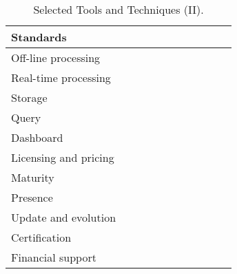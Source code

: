 \begin{sidewaystable}[!ht]
\begin{center}
\begin{tabular}[c]{|p{1.7cm}|p{1.5cm}|p{1.5cm}|p{1.5cm}|p{1.5cm}|p{1.5cm}|p{1.5cm}|p{1.5cm}|p{1.5cm}|p{1.5cm}|p{1.5cm}|}
  Standards &  &   &  &  &  &  &  &  &  & \\ \hline  
  Off-line processing &  &   &  &  &  &  &  &  &  & \\ \hline  
  Real-time processing &  &   &  &  &  &  &  &  &  & \\ \hline  
  Storage &  &   &  &  &  &  &  &  &  & \\ \hline  
  Query &  &   &  &  &  &  &  &  &  & \\ \hline  
  Dashboard &  &   &  &  &  &  &  &  &  & \\ \hline  
  Licensing and pricing &  &   &  &  &  &  &  &  &  & \\ \hline  
  Maturity &  &   &  &  &  &  &  &  &  & \\ \hline  
  Presence &  &   &  &  &  &  &  &  &  & \\ \hline  
  Update and evolution &  &   &  &  &  &  &  &  &  & \\ \hline  
  Certification &  &   &  &  &  &  &  &  &  & \\ \hline  
  Financial support &  &   &  &  &  &  &  &  &  & \\ \hline  

\hline
\end{tabular}
\caption{Selected Tools and Techniques (II).}\label{table:tools-ii}
  \end{center}
\end{sidewaystable} 

